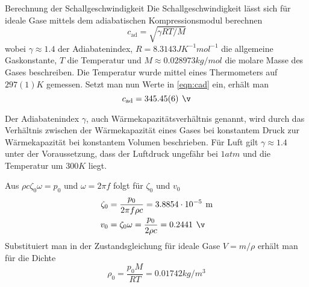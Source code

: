 \documentclass{alex_gp}
\begin{document}
\begin{mybox}{Berechnung der Schallgeschwindigkeit}
	Die Schallgeschwindigkeit lässt sich für ideale Gase mittels dem adiabatischen Kompressionsmodul berechnen 
	\begin{equation}\label{eqn:cad}
		c_{\text{ad}} = \sqrt{\gamma RT/M}
	\end{equation}
	wobei \( \gamma \approx 1.4 \) der Adiabatenindex, \( R = 8.3143 \unit{J K^{-1} mol^{-1}} \) die allgemeine Gaskonstante, \( T \) die Temperatur und \( M \approx 0.028973 \unit{kg/mol} \) die molare Masse des Gases beschreiben.
	Die Temperatur wurde mittel eines Thermometers auf \( 297(1) \unit{K} \) gemessen. 
	Setzt man nun Werte in \autoref{eqn:cad} ein, erhält man 
	\begin{equation}\label{eqn:cad2}
		c_{\text{ad}} = 345.45(6) \unit{\v}
	\end{equation}
	
	
	
	Der Adiabatenindex \( \gamma \), auch Wärmekapazitätsverhältnis genannt, wird durch das Verhältnis zwischen der Wärmekapazität eines Gases bei konstantem Druck zur Wärmekapazität bei konstantem Volumen beschrieben. 
	Für Luft gilt \( \gamma \approx 1.4 \) unter der Voraussetzung, dass der Luftdruck ungefähr bei \( 1 \unit{atm} \) und die Temperatur um \( 300 \unit{K} \) liegt.
	
	Aus \( 	\rho c \zeta_0 \omega = p_0 \) und \( \omega = 2\pi f \) folgt für \( \zeta_0 \) und \( v_0 \)
	\begin{align}\label{eqn:zeta}
		\zeta_0 &= \frac{p_0}{2\pi f\rho c} = 3.8854 \cdot 10^{-5} \unit{m} \\
		v_0 &= \zeta_0\omega = \frac{p_0}{2\rho c} = 0.2441 \unit{\v}
	\end{align}
	Substituiert man in der Zustandsgleichung für ideale Gase \( V = m/\rho \) erhält man für die Dichte
	\begin{equation}\label{eqn:density}
		\rho_0 = \frac{p_0M}{RT} = 0.01742 \unit{kg/m^3}
	\end{equation}
\end{mybox}
\end{document}
